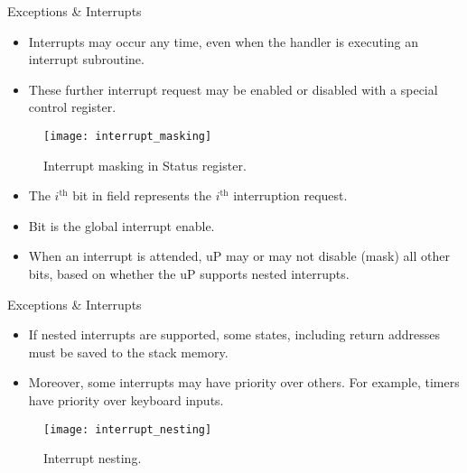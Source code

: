 % 
\begin{frame}{Exceptions \& Interrupts}{}
\begin{itemize}
\item Interrupts may occur any time, even when the handler is executing an interrupt subroutine.
\item These further interrupt request may be enabled or disabled with a special control register.
\end{itemize}
\begin{figure}
\centering
\texttt{[image: interrupt\_masking]}
\caption{Interrupt masking in Status register.}
\label{Figure:interrupt_masking}
\end{figure}
\begin{itemize}
\item The $i^{\mathrm{th}}$ bit in  field represents the  $i^{\mathrm{th}}$ interruption request.
\item Bit  is the global interrupt enable.
\item When an interrupt is attended, \ac{uP} may or may not disable (mask) all other  bits, based on whether the \ac{uP} supports nested interrupts.
\end{itemize}
\end{frame}
% 
\begin{frame}{Exceptions \& Interrupts}{}
\begin{itemize}
\item If nested interrupts are supported, some states, including return addresses must be saved to the stack memory.
\item Moreover, some interrupts may have priority over others. For example, timers have priority over keyboard inputs.
\end{itemize}
\begin{figure}
\centering
\texttt{[image: interrupt\_nesting]}
\caption{Interrupt nesting.}
\label{Figure:interrupt_nesting}
\end{figure}
\end{frame}

